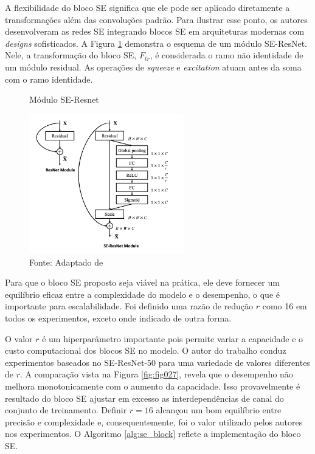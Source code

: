 A flexibilidade do bloco \gls{SE} significa que ele pode ser aplicado diretamente a transformações além das convoluções padrão. Para ilustrar esse ponto, os autores desenvolveram as redes \gls{SE}  integrando blocos \gls{SE} em arquiteturas modernas com \textit{designs} sofisticados. A Figura \ref{fig:fig026} demonstra o esquema de um módulo SE-ResNet. Nele, a transformação do bloco \gls{SE}, $F_{tr}$, é considerada o ramo não identidade de um módulo residual. As operações de \textit{squeeze} e \textit{excitation} atuam antes da soma com o ramo identidade.


\begin{figure}[h!]
    \centering
    \caption{Módulo SE-Resnet}
    \includegraphics[width=0.6\textwidth]{figures/fig026.png}
    \caption*{Fonte: Adaptado de \cite{huSqueezeandExcitationNetworks2018}}
    \label{fig:fig026}
\end{figure}

Para que o bloco SE proposto seja viável na prática, ele deve fornecer um equilíbrio eficaz entre a complexidade do modelo e o desempenho, o que é importante para escalabilidade. Foi definido uma razão de redução $r$ como 16 em todos os experimentos, exceto onde indicado de outra forma. 

O valor $r$ é um hiperparâmetro importante pois permite variar a capacidade e o custo computacional dos blocos \gls{SE} no modelo. O autor do trabalho conduz experimentos baseados no SE-ResNet-50 para uma variedade de valores diferentes de $r$. A comparação vista na Figura  \ref{fig:fig027}, revela que o desempenho não melhora monotonicamente com o aumento da capacidade. Isso provavelmente é resultado do bloco SE ajustar em excesso as interdependências de canal do conjunto de treinamento. Definir $r = 16$ alcançou um bom equilíbrio entre precisão e complexidade e, consequentemente, foi o valor utilizado pelos autores nos experimentos. O Algoritmo \ref{alg:se_block} reflete a implementação do bloco \gls{SE}.

